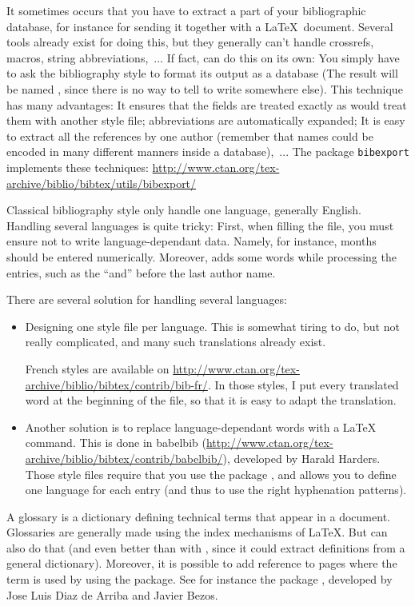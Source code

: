 It sometimes occurs that you have to extract a part of your bibliographic
database, for instance for sending it together with a \LaTeX~document. Several
tools already exist for doing this, but they generally can't handle crossrefs,
macros, string abbreviations,~... If fact, \bt can do this on its own: You
simply have to ask the bibliography style to format its output as a 
 database (The result will be named , since there is no way
to tell \bt to write somewhere else). This technique has many advantages: It
ensures that the fields are treated exactly as \bt would treat them with
another style file; abbreviations are automatically expanded; It is easy to
extract all the references by one author (remember that names could be encoded
in many different manners inside a  database),~...
The package \verb+bibexport+ implements these techniques:
\url{http://www.ctan.org/tex-archive/biblio/bibtex/utils/bibexport/}


Classical bibliography style only handle one language, generally English.
Handling several languages is quite tricky: First, when filling the 
file, you must ensure not to write language-dependant data. Namely, for
instance, months should be entered numerically. Moreover, \bt adds some words
while processing the entries, such as the ``and'' before the last author name. 

There are several solution for handling several languages:
\begin{itemize}
\item Designing one style file per language. This is somewhat tiring to do,
  but not really complicated, and many such translations already exist.

  French styles are available on  
  \url{http://www.ctan.org/tex-archive/biblio/bibtex/contrib/bib-fr/}. In
  those styles, I put every translated word at the beginning of the file, so
  that it is easy to adapt the translation.

\item Another solution is to replace language-dependant words with a \LaTeX
  command. This is done in \textsf{babelbib}
  (\url{http://www.ctan.org/tex-archive/biblio/bibtex/contrib/babelbib/}),
  developed by Harald Harders.
  Those style files require that you use the package , and allows
  you to define one language for each entry (and thus to use the right
  hyphenation patterns).
\end{itemize}



A glossary is a dictionary defining technical terms that appear in a
document. Glossaries are generally made using the index mechanisms of \LaTeX. 
But \bt can also do that (and even better than with , since it
could extract definitions from a general dictionary). Moreover, it is
possible to add reference to pages where the term is used by using the
 package. See for instance the package , developed by
Jose Luis Diaz de Arriba and Javier Bezos.
